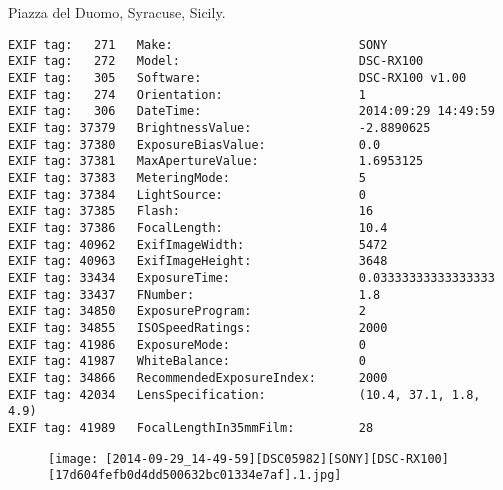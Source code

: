 \section{\protect{}}
\noindent Piazza del Duomo, Syracuse, Sicily.
\noindent
\begin{lstlisting}
EXIF tag:   271   Make:                          SONY
EXIF tag:   272   Model:                         DSC-RX100
EXIF tag:   305   Software:                      DSC-RX100 v1.00
EXIF tag:   274   Orientation:                   1
EXIF tag:   306   DateTime:                      2014:09:29 14:49:59
EXIF tag: 37379   BrightnessValue:               -2.8890625
EXIF tag: 37380   ExposureBiasValue:             0.0
EXIF tag: 37381   MaxApertureValue:              1.6953125
EXIF tag: 37383   MeteringMode:                  5
EXIF tag: 37384   LightSource:                   0
EXIF tag: 37385   Flash:                         16
EXIF tag: 37386   FocalLength:                   10.4
EXIF tag: 40962   ExifImageWidth:                5472
EXIF tag: 40963   ExifImageHeight:               3648
EXIF tag: 33434   ExposureTime:                  0.03333333333333333
EXIF tag: 33437   FNumber:                       1.8
EXIF tag: 34850   ExposureProgram:               2
EXIF tag: 34855   ISOSpeedRatings:               2000
EXIF tag: 41986   ExposureMode:                  0
EXIF tag: 41987   WhiteBalance:                  0
EXIF tag: 34866   RecommendedExposureIndex:      2000
EXIF tag: 42034   LensSpecification:             (10.4, 37.1, 1.8, 4.9)
EXIF tag: 41989   FocalLengthIn35mmFilm:         28

\end{lstlisting}
\clearpage
\begin{figure}
\raggedleft
\texttt{[image: [2014-09-29\_14-49-59][DSC05982][SONY][DSC-RX100][17d604fefb0d4dd500632bc01334e7af].1.jpg]}
\end{figure}


\clearpage
